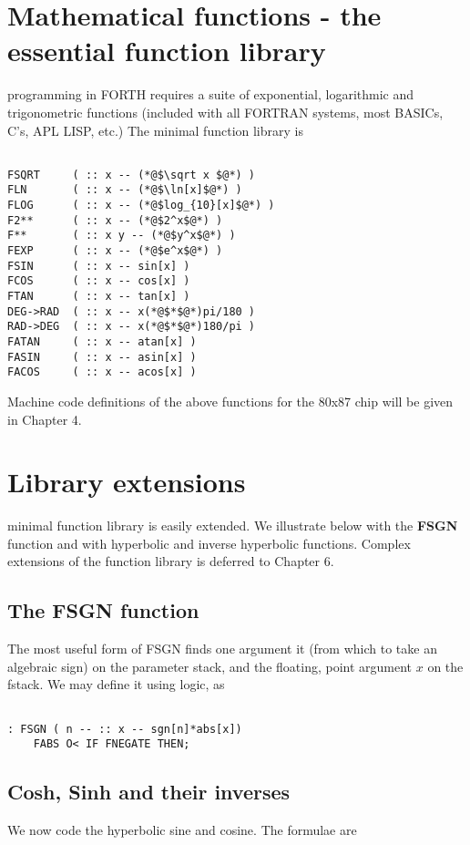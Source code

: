 \section{Mathematical functions - the essential function library}

 programming in FORTH requires a suite of exponential,
logarithmic and trigonometric functions (included with all
FORTRAN systems, most BASICs, C's, APL LISP, etc.) The
minimal function library is

\begin{lstlisting}

FSQRT     ( :: x -- (*@$\sqrt x $@*) )
FLN       ( :: x -- (*@$\ln[x]$@*) )
FLOG      ( :: x -- (*@$log_{10}[x]$@*) )
F2**      ( :: x -- (*@$2^x$@*) )
F**       ( :: x y -- (*@$y^x$@*) )
FEXP      ( :: x -- (*@$e^x$@*) )
FSIN      ( :: x -- sin[x] )
FCOS      ( :: x -- cos[x] )
FTAN      ( :: x -- tan[x] )
DEG->RAD  ( :: x -- x(*@$*$@*)pi/180 )
RAD->DEG  ( :: x -- x(*@$*$@*)180/pi )
FATAN     ( :: x -- atan[x] )
FASIN     ( :: x -- asin[x] )
FACOS     ( :: x -- acos[x] )

\end{lstlisting}

Machine code definitions of the above functions for the 80x87
chip will be given in Chapter 4.

\section{Library extensions}

 minimal function library is easily extended. We illustrate
below with the \textbf{FSGN} function and with hyperbolic and inverse hyperbolic
functions. Complex extensions of the function
library is deferred to Chapter 6.

\subsection{The FSGN function}
The most useful form of FSGN finds one argument it (from which
to take an algebraic sign) on the parameter stack, and the floating,
point argument $x$ on the fstack. We may define it using logic, as
\begin{verbatim}

: FSGN ( n -- :: x -- sgn[n]*abs[x])
    FABS O< IF FNEGATE THEN;
\end{verbatim}

\subsection{Cosh, Sinh and their inverses}
We now code the hyperbolic sine and cosine. The formulae are

